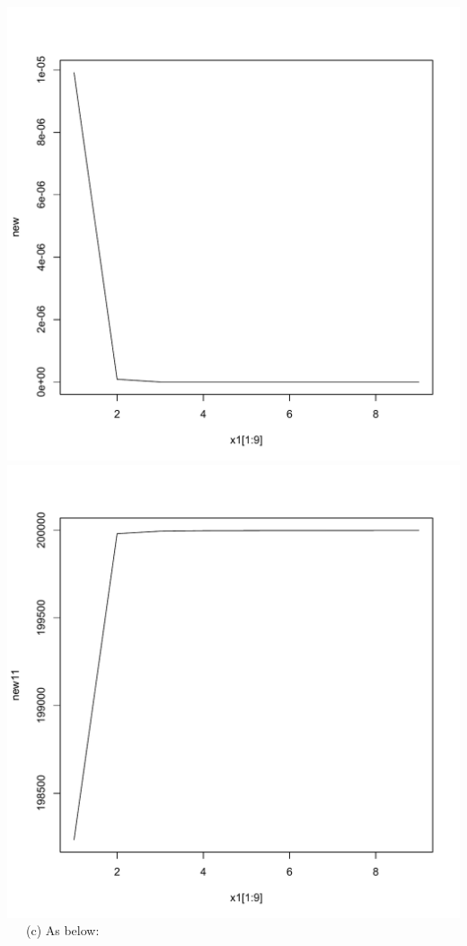 \documentclass[11pt]{article}
\begin{document}
\includegraphics[scale=0.5]{pdf2222.pdf}
\includegraphics[scale=0.5]{cdf2222.pdf} \\
~~~(c) As below: \\
\end{document}
